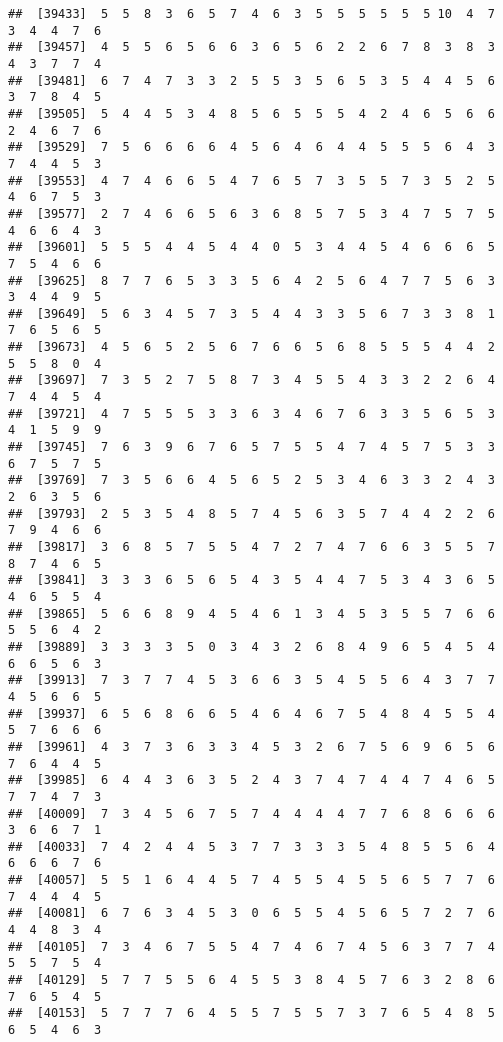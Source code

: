 \documentclass[
]{book}
\begin{document}
\begin{verbatim}
##  [39433]  5  5  8  3  6  5  7  4  6  3  5  5  5  5  5  5 10  4  7  3  4  4  7  6
##  [39457]  4  5  5  6  5  6  6  3  6  5  6  2  2  6  7  8  3  8  3  4  3  7  7  4
##  [39481]  6  7  4  7  3  3  2  5  5  3  5  6  5  3  5  4  4  5  6  3  7  8  4  5
##  [39505]  5  4  4  5  3  4  8  5  6  5  5  5  4  2  4  6  5  6  6  2  4  6  7  6
##  [39529]  7  5  6  6  6  6  4  5  6  4  6  4  4  5  5  5  6  4  3  7  4  4  5  3
##  [39553]  4  7  4  6  6  5  4  7  6  5  7  3  5  5  7  3  5  2  5  4  6  7  5  3
##  [39577]  2  7  4  6  6  5  6  3  6  8  5  7  5  3  4  7  5  7  5  4  6  6  4  3
##  [39601]  5  5  5  4  4  5  4  4  0  5  3  4  4  5  4  6  6  6  5  7  5  4  6  6
##  [39625]  8  7  7  6  5  3  3  5  6  4  2  5  6  4  7  7  5  6  3  3  4  4  9  5
##  [39649]  5  6  3  4  5  7  3  5  4  4  3  3  5  6  7  3  3  8  1  7  6  5  6  5
##  [39673]  4  5  6  5  2  5  6  7  6  6  5  6  8  5  5  5  4  4  2  5  5  8  0  4
##  [39697]  7  3  5  2  7  5  8  7  3  4  5  5  4  3  3  2  2  6  4  7  4  4  5  4
##  [39721]  4  7  5  5  5  3  3  6  3  4  6  7  6  3  3  5  6  5  3  4  1  5  9  9
##  [39745]  7  6  3  9  6  7  6  5  7  5  5  4  7  4  5  7  5  3  3  6  7  5  7  5
##  [39769]  7  3  5  6  6  4  5  6  5  2  5  3  4  6  3  3  2  4  3  2  6  3  5  6
##  [39793]  2  5  3  5  4  8  5  7  4  5  6  3  5  7  4  4  2  2  6  7  9  4  6  6
##  [39817]  3  6  8  5  7  5  5  4  7  2  7  4  7  6  6  3  5  5  7  8  7  4  6  5
##  [39841]  3  3  3  6  5  6  5  4  3  5  4  4  7  5  3  4  3  6  5  4  6  5  5  4
##  [39865]  5  6  6  8  9  4  5  4  6  1  3  4  5  3  5  5  7  6  6  5  5  6  4  2
##  [39889]  3  3  3  3  5  0  3  4  3  2  6  8  4  9  6  5  4  5  4  6  6  5  6  3
##  [39913]  7  3  7  7  4  5  3  6  6  3  5  4  5  5  6  4  3  7  7  4  5  6  6  5
##  [39937]  6  5  6  8  6  6  5  4  6  4  6  7  5  4  8  4  5  5  4  5  7  6  6  6
##  [39961]  4  3  7  3  6  3  3  4  5  3  2  6  7  5  6  9  6  5  6  7  6  4  4  5
##  [39985]  6  4  4  3  6  3  5  2  4  3  7  4  7  4  4  7  4  6  5  7  7  4  7  3
##  [40009]  7  3  4  5  6  7  5  7  4  4  4  4  7  7  6  8  6  6  6  3  6  6  7  1
##  [40033]  7  4  2  4  4  5  3  7  7  3  3  3  5  4  8  5  5  6  4  6  6  6  7  6
##  [40057]  5  5  1  6  4  4  5  7  4  5  5  4  5  5  6  5  7  7  6  7  4  4  4  5
##  [40081]  6  7  6  3  4  5  3  0  6  5  5  4  5  6  5  7  2  7  6  4  4  8  3  4
##  [40105]  7  3  4  6  7  5  5  4  7  4  6  7  4  5  6  3  7  7  4  5  5  7  5  4
##  [40129]  5  7  7  5  5  6  4  5  5  3  8  4  5  7  6  3  2  8  6  7  6  5  4  5
##  [40153]  5  7  7  7  6  4  5  5  7  5  5  7  3  7  6  5  4  8  5  6  5  4  6  3

\end{verbatim}
\end{document}
